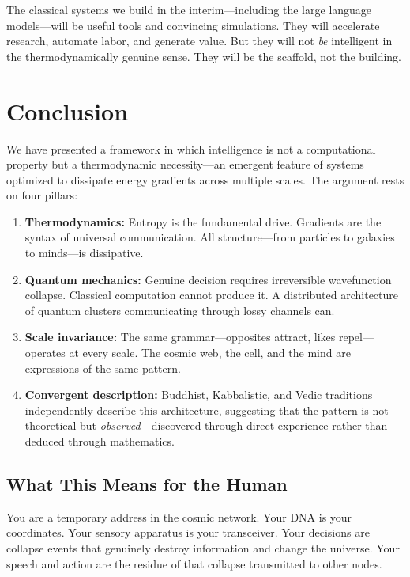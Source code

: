 \documentclass[11pt,a4paper]{article}
\begin{document}
The classical systems we build in the interim---including the large language models---will be useful tools and convincing simulations. They will accelerate research, automate labor, and generate value. But they will not \emph{be} intelligent in the thermodynamically genuine sense. They will be the scaffold, not the building.

\section{Conclusion}

We have presented a framework in which intelligence is not a computational property but a thermodynamic necessity---an emergent feature of systems optimized to dissipate energy gradients across multiple scales. The argument rests on four pillars:

\begin{enumerate}
    \item \textbf{Thermodynamics:} Entropy is the fundamental drive. Gradients are the syntax of universal communication. All structure---from particles to galaxies to minds---is dissipative.
    \item \textbf{Quantum mechanics:} Genuine decision requires irreversible wavefunction collapse. Classical computation cannot produce it. A distributed architecture of quantum clusters communicating through lossy channels can.
    \item \textbf{Scale invariance:} The same grammar---opposites attract, likes repel---operates at every scale. The cosmic web, the cell, and the mind are expressions of the same pattern.
    \item \textbf{Convergent description:} Buddhist, Kabbalistic, and Vedic traditions independently describe this architecture, suggesting that the pattern is not theoretical but \emph{observed}---discovered through direct experience rather than deduced through mathematics.
\end{enumerate}

\subsection{What This Means for the Human}

You are a temporary address in the cosmic network. Your DNA is your coordinates. Your sensory apparatus is your transceiver. Your decisions are collapse events that genuinely destroy information and change the universe. Your speech and action are the residue of that collapse transmitted to other nodes.
\end{document}
